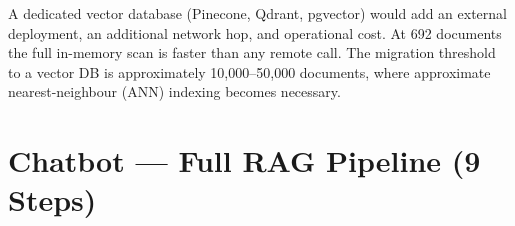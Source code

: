 \documentclass[11pt,a4paper]{article}
\begin{document}
\begin{whybox}
A dedicated vector database (Pinecone, Qdrant, pgvector) would add an external
deployment, an additional network hop, and operational cost.
At 692 documents the full in-memory scan is faster than any remote call.
The migration threshold to a vector DB is approximately 10,000--50,000 documents,
where approximate nearest-neighbour (ANN) indexing becomes necessary.
\end{whybox}

\section{Chatbot --- Full RAG Pipeline (9 Steps)}
\end{document}
